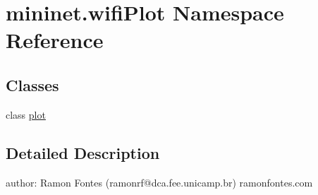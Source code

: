 \hypertarget{namespacemininet_1_1wifiPlot}{\section{mininet.\-wifi\-Plot Namespace Reference}
\label{namespacemininet_1_1wifiPlot}
}
\subsection*{Classes}
\begin{DoxyCompactItemize}
\item 
class \hyperlink{classmininet_1_1wifiPlot_1_1plot}{plot}
\end{DoxyCompactItemize}


\subsection{Detailed Description}
\begin{DoxyVerb}author: Ramon Fontes (ramonrf@dca.fee.unicamp.br)
ramonfontes.com\end{DoxyVerb}
 